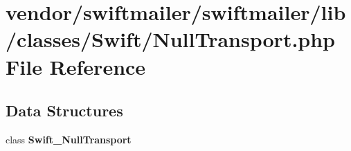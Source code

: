 \section{vendor/swiftmailer/swiftmailer/lib/classes/\+Swift/\+Null\+Transport.php File Reference}
\label{_null_transport_8php}
\subsection*{Data Structures}
\begin{DoxyCompactItemize}
\item 
class {\bf Swift\+\_\+\+Null\+Transport}
\end{DoxyCompactItemize}
